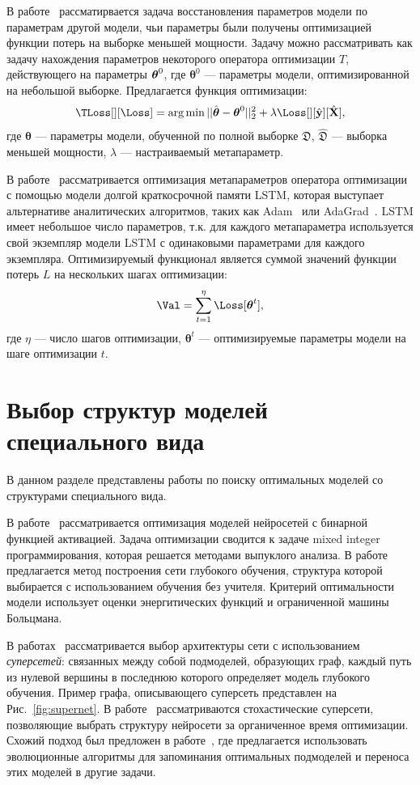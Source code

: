 В работе~\cite{l2l} рассматирвается задача восстановления параметров модели по параметрам  другой модели, чьи параметры были получены оптимизацией функции потерь на выборке меньшей мощности. Задачу можно рассматривать как задачу нахождения параметров некоторого оператора оптимизации $T$, действующего на параметры $\boldsymbol{\theta}^0$, где $\boldsymbol{\theta}^0$ --- параметры модели, оптимизированной на небольшой выборке.  Предлагается функция оптимизации:
\[
   \TLoss[][\Loss] = \argmin ||\hat{\boldsymbol{\theta}} -  \boldsymbol{\theta}^0||_2^2 + \lambda \Loss[][\hat{\y}][\hat{\X}],
\]
где $\boldsymbol{\theta}$ --- параметры модели, обученной по полной выборке $\mathfrak{D}$, $\hat{\mathfrak{D}}$ --- выборка меньшей мощности, ${\lambda}$ --- настраиваемый метапараметр.

В работе~\cite{l2l_by_gd_gd} рассматривается оптимизация метапараметров оператора оптимизации с помощью модели долгой краткосрочной памяти LSTM, которая выступает альтернативе аналитических алгоритмов, таких как Adam~\cite{adam} или AdaGrad~\cite{adagrad}. LSTM имеет небольшое число параметров, т.к. для каждого метапараметра используется свой экземпляр модели LSTM с одинаковыми параметрами для каждого экземпляра. Оптимизируемый функционал является суммой значений функции потерь $L$ на нескольких шагах оптимизации:
\[
   \Val = \sum_{t=1}^\eta \Loss[\teta^{t}],
\]
где $\eta$ --- число шагов оптимизации, $\boldsymbol{\theta}^t$ --- оптимизируемые параметры модели на шаге оптимизации $t$.


\section{Выбор структур моделей специального вида}
В данном разделе представлены работы по поиску оптимальных моделей со структурами специального вида.

В работе~\cite{mixed} рассматривается оптимизация моделей нейросетей с бинарной функцией активацией. Задача оптимизации сводится к задаче mixed integer программирования, которая решается методами выпуклого анализа.
В работе~\cite{energynet} предлагается метод построения сети глубокого обучения, структура которой выбирается с использованием обучения без учителя. Критерий оптимальности модели использует оценки энергитических функций и ограниченной машины Больцмана.

В работах~\cite{pathnet, supernet} рассматривается выбор архитектуры сети с использованием \textit{суперсетей}: связанных между собой подмоделей, образующих граф, каждый  путь из нулевой вершины в последнюю которого определяет модель глубокого обучения. Пример графа, описывающего суперсеть представлен на Рис.~\ref{fig:supernet}. В работе~\cite{supernet} рассматриваются стохастические суперсети, позволяющие выбрать структуру нейросети за органиченное время оптимизации. 
Схожий подход был предложен в работе~\cite{pathnet}, где предлагается использовать эволюционные алгоритмы для запоминания оптимальных подмоделей и переноса этих моделей в другие задачи.


